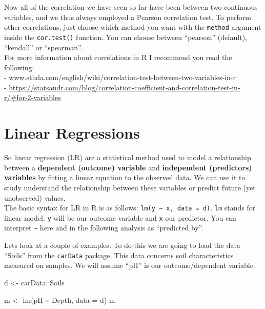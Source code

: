 \documentclass[
]{book}
\newenvironment{Shaded}{\begin{snugshade}}{\end{snugshade}}
\newcommand{\AttributeTok}[1]{\textcolor[rgb]{0.77,0.63,0.00}{#1}}
\newcommand{\FunctionTok}[1]{\textcolor[rgb]{0.00,0.00,0.00}{#1}}
\newcommand{\NormalTok}[1]{#1}
\newcommand{\OtherTok}[1]{\textcolor[rgb]{0.56,0.35,0.01}{#1}}
\newcommand{\SpecialCharTok}[1]{\textcolor[rgb]{0.00,0.00,0.00}{#1}}
\begin{document}
Now all of the correlation we have seen so far have been between two continuous variables, and we thus always employed a Pearson correlation test. To perform other correlations, just choose which method you want with the \texttt{method} argument inside the \texttt{cor.test()} function. You can choose between ``pearson'' (default), ``kendall'' or ``spearman''.\\

For more information about correlations in R I recommend you read the following:\\
- www.sthda.com/english/wiki/correlation-test-between-two-variables-in-r\\
- \url{https://statsandr.com/blog/correlation-coefficient-and-correlation-test-in-r/\#for-2-variables}

\hypertarget{linear-regressions}{%
\section{Linear Regressions}\label{linear-regressions}}

So linear regression (LR) are a statistical method used to model a relationship between a \textbf{dependent (outcome) variable} and \textbf{independent (predictors) variables} by fitting a linear equation to the observed data. We can use it to study understand the relationship between these variables or predict future (yet unobserved) values.\\
The basic syntax for LR in R is as follows: \texttt{lm(y\ \textasciitilde{}\ x,\ data\ =\ d)}. \texttt{lm} stands for linear model. \texttt{y} will be our outcome variable and \texttt{x} our predictor. You can interpret \texttt{\textasciitilde{}} here and in the following analysis as ``predicted by''.

Lets look at a couple of examples. To do this we are going to load the data ``Soils'' from the \texttt{carData} package. This data concerns soil characteristics measured on samples. We will assume ``pH'' is our outcome/dependent variable.

\begin{Shaded}
\begin{Highlighting}[]
\NormalTok{d }\OtherTok{\textless{}{-}}\NormalTok{ carData}\SpecialCharTok{::}\NormalTok{Soils}

\NormalTok{m }\OtherTok{\textless{}{-}} \FunctionTok{lm}\NormalTok{(pH }\SpecialCharTok{\textasciitilde{}}\NormalTok{ Depth, }\AttributeTok{data =}\NormalTok{ d)}
\NormalTok{m}
\end{Highlighting}
\end{Shaded}
\end{document}

